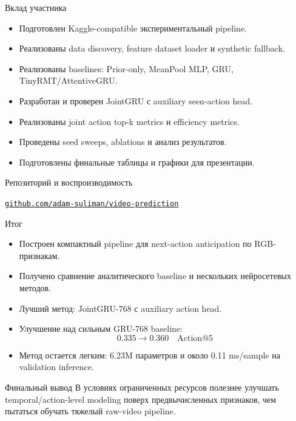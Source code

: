 \documentclass[aspectratio=169,10pt]{beamer}
\begin{document}
\begin{frame}{Вклад участника}
    \begin{itemize}
        \item Подготовлен Kaggle-compatible экспериментальный pipeline.
        \item Реализованы data discovery, feature dataset loader и synthetic fallback.
        \item Реализованы baselines: Prior-only, MeanPool MLP, GRU, TinyRMT/AttentiveGRU.
        \item Разработан и проверен JointGRU с auxiliary seen-action head.
        \item Реализованы joint action top-k metrics и efficiency metrics.
        \item Проведены seed sweeps, ablations и анализ результатов.
        \item Подготовлены финальные таблицы и графики для презентации.
    \end{itemize}
\end{frame}

\begin{frame}{Репозиторий и воспроизводимость}
    \centering
    \vspace{0.25cm}

    \vspace{0.5cm}
    \Large
    \href{https://github.com/adam-suliman/video-prediction}{\texttt{github.com/adam-suliman/video-prediction}}
\end{frame}

\begin{frame}{Итог}
    \begin{itemize}
        \item Построен компактный pipeline для next-action anticipation по RGB-признакам.
        \item Получено сравнение аналитического baseline и нескольких нейросетевых методов.
        \item Лучший метод: JointGRU-768 с auxiliary action head.
        \item Улучшение над сильным GRU-768 baseline:
        \[
            0.335 \rightarrow 0.360 \quad \text{Action@5}
        \]
        \item Метод остается легким: 6.23M параметров и около 0.11 ms/sample на validation inference.
    \end{itemize}

    \vspace{0.25cm}
    \begin{block}{Финальный вывод}
        В условиях ограниченных ресурсов полезнее улучшать temporal/action-level modeling поверх предвычисленных признаков, чем пытаться обучать тяжелый raw-video pipeline.
    \end{block}
\end{frame}
\end{document}
